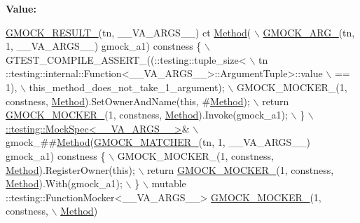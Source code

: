{\bfseries Value\+:}
\begin{DoxyCode}
\hyperlink{gmock-generated-function-mockers_8h_a0e9d94e9c77df84f1103af06feee1077}{GMOCK\_RESULT\_}(tn, \_\_VA\_ARGS\_\_) ct \hyperlink{gmock-spec-builders__test_8cc_a95606368148f3e5aab5db46c32466afd}{Method}( \(\backslash\)
      \hyperlink{gmock-generated-function-mockers_8h_a887575cc1c31158fba808180a10c004f}{GMOCK\_ARG\_}(tn, 1, \_\_VA\_ARGS\_\_) gmock\_a1) constness \{ \(\backslash\)
    GTEST\_COMPILE\_ASSERT\_((::testing::tuple\_size<                          \(\backslash\)
        tn ::testing::internal::Function<\_\_VA\_ARGS\_\_>::ArgumentTuple>::value \(\backslash\)
            == 1), \(\backslash\)
        this\_method\_does\_not\_take\_1\_argument); \(\backslash\)
    GMOCK\_MOCKER\_(1, constness, \hyperlink{gmock-spec-builders__test_8cc_a95606368148f3e5aab5db46c32466afd}{Method}).SetOwnerAndName(\textcolor{keyword}{this}, #\hyperlink{gmock-spec-builders__test_8cc_a95606368148f3e5aab5db46c32466afd}{Method}); \(\backslash\)
    return \hyperlink{gmock-generated-function-mockers_8h_a7d362499e27b1bc3a9806dd3cf58a5b7}{GMOCK\_MOCKER\_}(1, constness, \hyperlink{gmock-spec-builders__test_8cc_a95606368148f3e5aab5db46c32466afd}{Method}).Invoke(gmock\_a1); \(\backslash\)
  \} \(\backslash\)
  \hyperlink{classtesting_1_1internal_1_1_mock_spec}{::testing::MockSpec<\_\_VA\_ARGS\_\_>}& \(\backslash\)
      gmock\_##\hyperlink{gmock-spec-builders__test_8cc_a95606368148f3e5aab5db46c32466afd}{Method}(\hyperlink{gmock-generated-function-mockers_8h_aa87d0009fe91f1c89d658776b55a769c}{GMOCK\_MATCHER\_}(tn, 1, \_\_VA\_ARGS\_\_) gmock\_a1) constness \{ \(\backslash\)
    GMOCK\_MOCKER\_(1, constness, \hyperlink{gmock-spec-builders__test_8cc_a95606368148f3e5aab5db46c32466afd}{Method}).RegisterOwner(\textcolor{keyword}{this}); \(\backslash\)
    return \hyperlink{gmock-generated-function-mockers_8h_a7d362499e27b1bc3a9806dd3cf58a5b7}{GMOCK\_MOCKER\_}(1, constness, \hyperlink{gmock-spec-builders__test_8cc_a95606368148f3e5aab5db46c32466afd}{Method}).With(gmock\_a1); \(\backslash\)
  \} \(\backslash\)
  mutable ::testing::FunctionMocker<\_\_VA\_ARGS\_\_> \hyperlink{gmock-generated-function-mockers_8h_a7d362499e27b1bc3a9806dd3cf58a5b7}{GMOCK\_MOCKER\_}(1, constness, \(\backslash\)
      \hyperlink{gmock-spec-builders__test_8cc_a95606368148f3e5aab5db46c32466afd}{Method})
\end{DoxyCode}
\mbox{\label{gmock-generated-function-mockers_8h_a885295ca6bebb15efb3fc786218c5d47}} 
